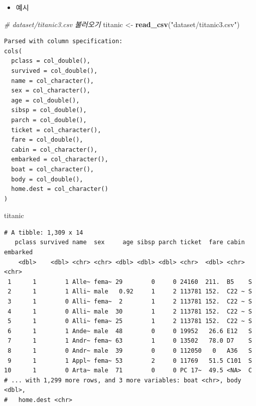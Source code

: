 \documentclass[
  11pt,
]{krantz}
\newenvironment{Shaded}{\begin{snugshade}}{\end{snugshade}}
\newcommand{\CommentTok}[1]{\textcolor[rgb]{0.37,0.37,0.37}{\textit{#1}}}
\newcommand{\KeywordTok}[1]{\textcolor[rgb]{0.27,0.27,0.27}{\textbf{#1}}}
\newcommand{\NormalTok}[1]{#1}
\newcommand{\StringTok}[1]{\textcolor[rgb]{0.5,0.5,0.5}{#1}}
\providecommand{\tightlist}{%
  \setlength{\itemsep}{0pt}\setlength{\parskip}{0pt}}
\begin{document}
\normalsize

\begin{itemize}
\tightlist
\item
  예시
\end{itemize}

\footnotesize

\begin{Shaded}
\begin{Highlighting}[]
\CommentTok{# dataset/titanic3.csv 불러오기}
\NormalTok{titanic <-}\StringTok{ }\KeywordTok{read_csv}\NormalTok{(}\StringTok{"dataset/titanic3.csv"}\NormalTok{)}
\end{Highlighting}
\end{Shaded}

\begin{verbatim}
Parsed with column specification:
cols(
  pclass = col_double(),
  survived = col_double(),
  name = col_character(),
  sex = col_character(),
  age = col_double(),
  sibsp = col_double(),
  parch = col_double(),
  ticket = col_character(),
  fare = col_double(),
  cabin = col_character(),
  embarked = col_character(),
  boat = col_character(),
  body = col_double(),
  home.dest = col_character()
)
\end{verbatim}

\begin{Shaded}
\begin{Highlighting}[]
\NormalTok{titanic}
\end{Highlighting}
\end{Shaded}

\begin{verbatim}
# A tibble: 1,309 x 14
   pclass survived name  sex     age sibsp parch ticket  fare cabin embarked
    <dbl>    <dbl> <chr> <chr> <dbl> <dbl> <dbl> <chr>  <dbl> <chr> <chr>   
 1      1        1 Alle~ fema~ 29        0     0 24160  211.  B5    S       
 2      1        1 Alli~ male   0.92     1     2 113781 152.  C22 ~ S       
 3      1        0 Alli~ fema~  2        1     2 113781 152.  C22 ~ S       
 4      1        0 Alli~ male  30        1     2 113781 152.  C22 ~ S       
 5      1        0 Alli~ fema~ 25        1     2 113781 152.  C22 ~ S       
 6      1        1 Ande~ male  48        0     0 19952   26.6 E12   S       
 7      1        1 Andr~ fema~ 63        1     0 13502   78.0 D7    S       
 8      1        0 Andr~ male  39        0     0 112050   0   A36   S       
 9      1        1 Appl~ fema~ 53        2     0 11769   51.5 C101  S       
10      1        0 Arta~ male  71        0     0 PC 17~  49.5 <NA>  C       
# ... with 1,299 more rows, and 3 more variables: boat <chr>, body <dbl>,
#   home.dest <chr>
\end{verbatim}
\end{document}
